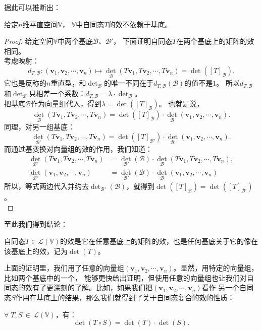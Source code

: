 \documentclass[12pt,UTF8]{ctexbook}
\begin{document}
据此可以推断出：
\begin{pp}\label{pp:10_10}
    给定$n$维平直空间$\mathbb{V}$，
    $\mathbb{V}$中自同态$T$的效不依赖于基底。
\end{pp}
\begin{proof} %
    给定空间$\mathbb{V}$中两个基底$\mathcal{B}$、$\mathcal{B}'$，
    下面证明自同态$T$在两个基底上的矩阵的效相同。\\
    考虑映射：
    $$ d_{T, \mathcal{B}} : (\mathbf{v}_1, \mathbf{v}_2, \cdots , \mathbf{v}_n) \mapsto \det_\mathcal{B} (T\mathbf{v}_1, T\mathbf{v}_2, \cdots , T\mathbf{v}_n) = \det([T]_\mathcal{B}).$$
    它也是反称的$n$重直型，和$\det_\mathcal{B}$的唯一不同在于$d_{T, \mathcal{B}}(\mathcal{B})$的值不是$1$。
    所以$d_{T, \mathcal{B}}$和$\det_{\mathcal{B}}$只相差一个系数：$d_{T, \mathcal{B}} = \lambda \cdot \det_{\mathcal{B}}$。\\
    把基底$\mathcal{B}$作为向量组代入，得到$\lambda = \det([T]_\mathcal{B})$。
    也就是说，
    $$ \det_\mathcal{B} (T\mathbf{v}_1, T\mathbf{v}_2, \cdots , T\mathbf{v}_n) = \det([T]_\mathcal{B}) \cdot \det_\mathcal{B} (\mathbf{v}_1, \mathbf{v}_2, \cdots , \mathbf{v}_n). $$
    同理，对另一组基底：
    $$ \det_{\mathcal{B}'} (T\mathbf{v}_1, T\mathbf{v}_2, \cdots , T\mathbf{v}_n) = \det([T]_{\mathcal{B}'}) \cdot \det_{\mathcal{B}'} (\mathbf{v}_1, \mathbf{v}_2, \cdots , \mathbf{v}_n). $$
    而通过基变换对向量组的效的作用，我们知道：
    \begin{align*}
        \det_{\mathcal{B}'} (T\mathbf{v}_1, T\mathbf{v}_2, \cdots , T\mathbf{v}_n) &= \det_{\mathcal{B}'}(\mathcal{B}) \cdot \det_\mathcal{B} (T\mathbf{v}_1, T\mathbf{v}_2, \cdots , T\mathbf{v}_n),  \\
        \det_{\mathcal{B}'} (\mathbf{v}_1, \mathbf{v}_2, \cdots , \mathbf{v}_n) &= \det_{\mathcal{B}'}(\mathcal{B}) \cdot \det_\mathcal{B} (\mathbf{v}_1, \mathbf{v}_2, \cdots , \mathbf{v}_n) 
    \end{align*}
    所以，等式两边代入并约去$\det_{\mathcal{B}'}(\mathcal{B})$，就得到$\det([T]_\mathcal{B}) = \det([T]_{\mathcal{B}'})$。\\
\end{proof}
至此我们得到结论：
\begin{df}
    自同态$T\in\mathcal{L}(\mathbb{V})$的效是它在任意基底上的矩阵的效，也是任何基底关于它的像在该基底上的效，记为$\det(T)$。
\end{df}

上面的证明里，我们用了任意的向量组$(\mathbf{v}_1, \mathbf{v}_2, \cdots , \mathbf{v}_n)$。显然，用特定的向量组，比如两个基底中的一个，
能够更快给出证明，但使用任意的向量组也让我们对自同态的效有了更深刻的了解。比如，如果我们把$(\mathbf{v}_1, \mathbf{v}_2, \cdots , \mathbf{v}_n)$看作
另一个自同态$S$作用在基底上的结果，那么我们就得到了关于自同态复合的效的性质：
\begin{pp}
    $\forall \;T,S\,\in\,\mathcal{L}(\mathbb{V})$，有：
    $$ \det (T\circ S) = \det(T) \cdot \det(S). $$
\end{pp}
\end{document}
